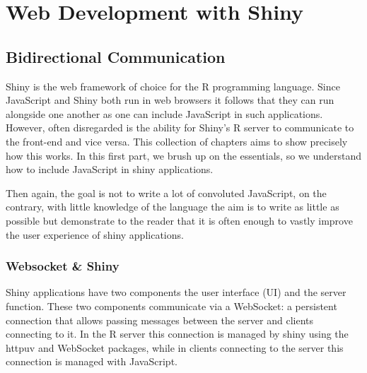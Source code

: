 \documentclass[
  10pt,
]{krantz}
\begin{document}
\hypertarget{part-web-development-with-shiny}{%
\part{Web Development with Shiny}\label{part-web-development-with-shiny}}

\hypertarget{shiny-intro}{%
\chapter{Bidirectional Communication}\label{shiny-intro}}

Shiny is the web framework of choice for the R programming language. Since JavaScript and Shiny both run in web browsers it follows that they can run alongside one another as one can include JavaScript in such applications. However, often disregarded is the ability for Shiny's R server to communicate to the front-end and vice versa. This collection of chapters aims to show precisely how this works. In this first part, we brush up on the essentials, so we understand how to include JavaScript in shiny applications.

Then again, the goal is not to write a lot of convoluted JavaScript, on the contrary, with little knowledge of the language the aim is to write as little as possible but demonstrate to the reader that it is often enough to vastly improve the user experience of shiny applications.

\hypertarget{shiny-intro-websocket}{%
\section{Websocket \& Shiny}\label{shiny-intro-websocket}}

Shiny applications have two components the user interface (UI) and the server function. These two components communicate via a WebSocket: a persistent connection that allows passing messages between the server and clients connecting to it. In the R server this connection is managed by shiny using the httpuv \citep{R-httpuv} and WebSocket \citep{R-websocket} packages, while in clients connecting to the server this connection is managed with JavaScript.
\end{document}
